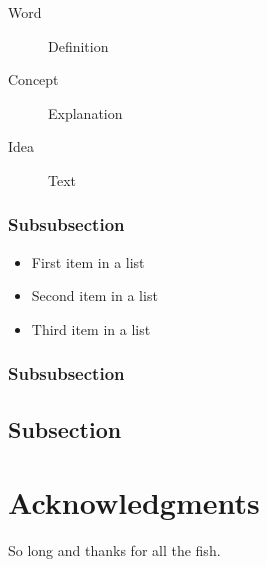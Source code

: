 \documentclass[fleqn,10pt]{SelfArx} %
\begin{document}
\lipsum[12] %

\begin{description}
\item[Word] Definition
\item[Concept] Explanation
\item[Idea] Text
\end{description}

\subsubsection{Subsubsection}

\lipsum[13] %

\begin{itemize}[noitemsep] %
\item First item in a list
\item Second item in a list
\item Third item in a list
\end{itemize}

\subsubsection{Subsubsection}

\lipsum[14] %

\subsection{Subsection}

\lipsum[15-23] %

\section*{Acknowledgments} %


So long and thanks for all the fish.

\printbibliography

\end{document}
